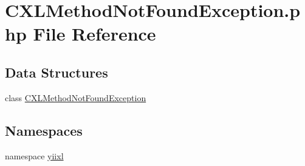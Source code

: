 \hypertarget{CXLMethodNotFoundException_8php}{
\section{CXLMethodNotFoundException.php File Reference}
\label{CXLMethodNotFoundException_8php}
}
\subsection*{Data Structures}
\begin{DoxyCompactItemize}
\item 
class \hyperlink{classCXLMethodNotFoundException}{CXLMethodNotFoundException}
\end{DoxyCompactItemize}
\subsection*{Namespaces}
\begin{DoxyCompactItemize}
\item 
namespace \hyperlink{namespaceyiixl}{yiixl}
\end{DoxyCompactItemize}
